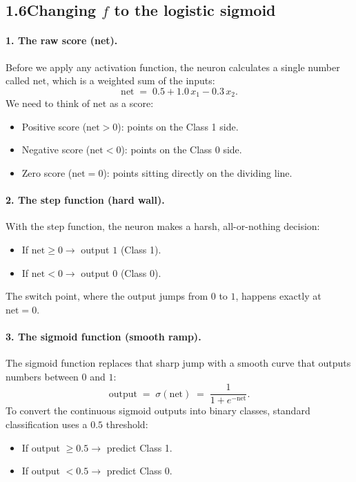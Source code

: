 \documentclass[11pt]{article}
\newcommand{\net}{\mathrm{net}}
\begin{document}
\subsection*{1.6\quad Changing $f$ to the logistic sigmoid}

\paragraph{1. The raw score (net).}
Before we apply any activation function, the neuron calculates a single number called
$\net$, which is a weighted sum of the inputs:
\[
\net \;=\; 0.5 + 1.0\,x_1 - 0.3\,x_2 .
\]
We need to think of $\net$ as a score:
\begin{itemize}[leftmargin=1.4em,itemsep=1pt]
\item Positive score ($\net > 0$): points on the Class 1 side.
\item Negative score ($\net < 0$): points on the Class 0 side.
\item Zero score ($\net = 0$): points sitting directly on the dividing line.
\end{itemize}

\paragraph{2. The step function (hard wall).}
With the step function, the neuron makes a harsh, all-or-nothing decision:
\begin{itemize}[leftmargin=1.4em,itemsep=1pt]
\item If $\net \ge 0 \rightarrow$ output $1$ (Class 1).
\item If $\net < 0 \rightarrow$ output $0$ (Class 0).
\end{itemize}
The switch point, where the output jumps from $0$ to $1$, happens exactly at $\net = 0$.

\paragraph{3. The sigmoid function (smooth ramp).}
The sigmoid function replaces that sharp jump with a smooth curve that outputs numbers
between $0$ and $1$:
\[
\text{output} \;=\; \sigma(\net) \;=\; \frac{1}{1 + e^{-\net}} .
\]
To convert the continuous sigmoid outputs into binary classes, standard classification uses
a $0.5$ threshold:
\begin{itemize}[leftmargin=1.4em,itemsep=1pt]
\item If output $\ge 0.5 \rightarrow$ predict Class 1.
\item If output $< 0.5 \rightarrow$ predict Class 0.
\end{itemize}
\end{document}
